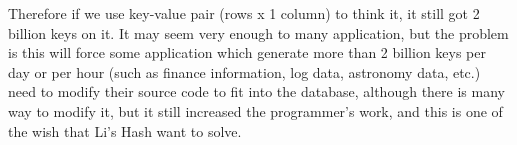 \begin{enumerate}
Therefore if we use key-value pair (rows x 1 column) to think it, it still got 2 billion keys on it. It may seem very enough to many application, but the problem is this will force some application which generate more than 2 billion keys per day or per hour (such as finance information, log data, astronomy data, etc.) need to modify their source code to fit into the database, although there is many way to modify it, but it still increased the programmer's work, and this is one of the wish that Li's Hash want to solve.

\end{enumerate}

\clearpage

